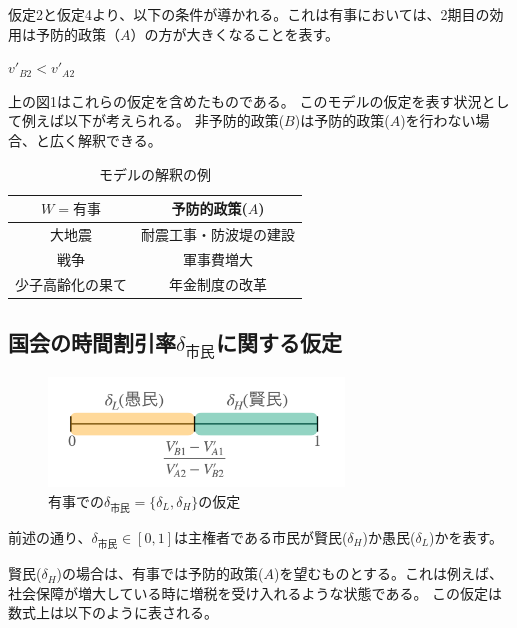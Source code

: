 \documentclass[main.tex]{subfiles}
\begin{document}
仮定2と仮定4より、以下の条件が導かれる。これは有事においては、2期目の効用は予防的政策（$A$）の方が大きくなることを表す。
\begin{condition}  $v'_{B2} < v'_{A2}$ \end{condition}


上の図1はこれらの仮定を含めたものである。
このモデルの仮定を表す状況として例えば以下が考えられる。
非予防的政策($B$)は予防的政策($A$)を行わない場合、と広く解釈できる。

\begin{table}[htbp]
  \caption{モデルの解釈の例}
  \label{table:data_type}
  \centering
  \begin{tabular}{cc}
    \toprule
    $W=有事$ & 予防的政策($A$) \\
    \midrule
    大地震 & 耐震工事・防波堤の建設 \\
    戦争 & 軍事費増大 \\
    少子高齢化の果て & 年金制度の改革 \\
    \bottomrule
  \end{tabular}
\end{table}



\subsection{国会の時間割引率$\delta_{市民}$に関する仮定}

\begin{figure}[htbp]
  \centering
  \includegraphics[width=0.7\textwidth]{./image/assumption_citizen_discount_rate.png}
  \caption{有事での$\delta_{市民}=\lbrace \delta_L, \delta_H \rbrace$の仮定} 
  \label{fig:assumption_citizen_discount_rate}
\end{figure}


前述の通り、$\delta_{市民}\in[0,1]$は主権者である市民が賢民($\delta_H$)か愚民($\delta_L$)かを表す。

賢民($\delta_H$)の場合は、有事では予防的政策($A$)を望むものとする。これは例えば、社会保障が増大している時に増税を受け入れるような状態である。
この仮定は数式上は以下のように表される。
\end{document}
